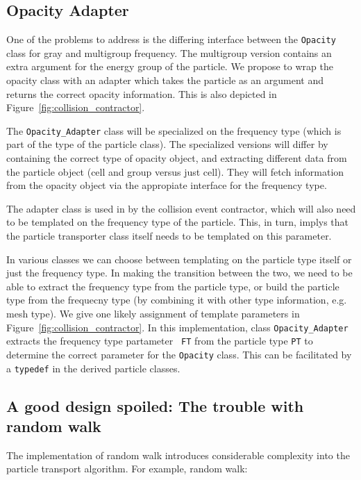 \documentclass[memo]{ResearchNote}
\begin{document}
\subsection{Opacity Adapter}

One of the problems to address is the differing interface between the
{\tt Opacity} class for gray and multigroup frequency.  The multigroup
version contains an extra argument for the energy group of the
particle. We propose to wrap the opacity class with an adapter which
takes the particle as an argument and returns the correct opacity
information. This is also depicted in
Figure~\ref{fig:collision_contractor}. 

The {\tt Opacity\_Adapter} class will be specialized on the frequency
type (which is part of the type of the particle class). The
specialized versions will differ by containing the correct type of
opacity object, and extracting different data from the particle object
(cell and group versus just cell). They will fetch information from
the opacity object via the appropiate interface for the frequency
type.

The adapter class is used in by the collision event contractor, which
will also need to be templated on the frequency type of the particle.
This, in turn, implys that the particle transporter class itself needs
to be templated on this parameter.

In various classes we can choose between templating on the particle
type itself or just the frequency type. In making the transition
between the two, we need to be able to extract the frequency type from
the particle type, or build the particle type from the frequecny type
(by combining it with other type information, e.g. mesh type). We give
one likely assignment of template parameters in
Figure~\ref{fig:collision_contractor}. In this implementation, class
{\tt Opacity\_Adapter} extracts the frequency type partameter {\tt
  FT} from the particle type {\tt PT} to determine the correct
parameter for the {\tt Opacity} class. This can be facilitated by a
{\tt typedef} in the derived particle classes.

\subsection{A good design spoiled: The trouble with random walk}

The implementation of random walk introduces considerable complexity
into the particle transport algorithm. For example, random walk:
\end{document}
